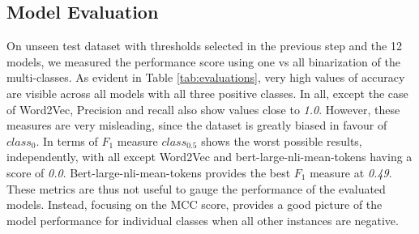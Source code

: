 \documentclass{ieeeaccess}
\begin{document}
\subsection{Model Evaluation}
On unseen test dataset with thresholds selected in the previous step and the 12 models, we measured the performance score using one vs all binarization of the multi-classes. As evident in Table \ref{tab:evaluations}, very high values of accuracy are visible across all models with all three positive classes. In all, except the case of Word2Vec, Precision and recall also show values close to \textit{1.0}. However, these measures are very misleading, since the dataset is greatly biased in favour of $class_0$. In terms of $F_1$ measure $class_{0.5}$ shows the worst possible results, independently, with all except Word2Vec and bert-large-nli-mean-tokens having a score of \textit{0.0}. Bert-large-nli-mean-tokens provides the best $F_1$ measure at \textit{0.49}. These metrics are thus not useful to gauge the performance of the evaluated models. Instead, focusing on the MCC score, provides a good picture of the model performance for individual classes when all other instances are negative.
\end{document}
